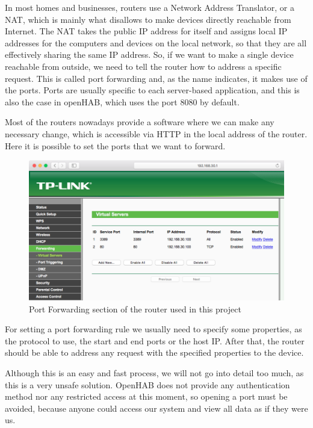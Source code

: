 In most homes and businesses, routers use a Network Address Translator, or a NAT, which is mainly what disallows to make devices
directly reachable from Internet. The NAT takes the public IP address for itself and assigns local IP addresses for the computers
and devices on the local network, so that they are all effectively sharing the same IP address. So, if we want to make a single
device reachable from outside, we need to tell the router how to address a specific request. This is called port forwarding and,
as the name indicates, it makes use of the ports. Ports are usually specific to each server-based application, and this is also the
case in openHAB, which uses the port 8080 by default.

Most of the routers nowadays provide a software where we can make any necessary change, which is accessible via HTTP in the local
address of the router. Here it is possible to set the ports that we want to forward.

\begin{figure}
	\centering
	\includegraphics[width=1\textwidth]{images/Chapter_07/port-forwarding.png}
	\caption{Port Forwarding section of the router used in this project}
	\label{fig:port-forwarding}
\end{figure}

For setting a port forwarding rule we usually need to specify some properties, as the protocol to use, the start and end ports or
the host IP. After that, the router should be able to address any request with the specified properties to the device.

Although this is an easy and fast process, we will not go into detail too much, as this is a very unsafe solution. OpenHAB does
not provide any authentication method nor any restricted access at this moment, so opening a port must be avoided, because anyone
could access our system and view all data as if they were us.

